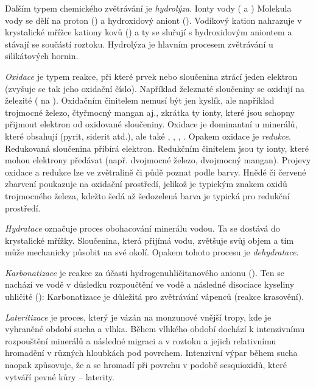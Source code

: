 Dalším typem chemického zvětrávání je \emph{hydrolýza}. Ionty vody ( a )  Molekula vody se dělí na proton () a hydroxidový aniont (). Vodíkový kation nahrazuje v krystalické mřížce kationy kovů () a ty se sluřují s hydroxidovým aniontem a stávají se součástí roztoku. Hydrolýza je hlavním procesem zvětrávání u silikátových hornin.

\emph{Oxidace} je typem reakce, při které prvek nebo sloučenina ztrácí jeden elektron (zvyšuje se tak jeho oxidační číslo). Například železnaté sloučeniny se oxidují na železité ( na ). Oxidačním činitelem nemusí být jen kyslík, ale například trojmocné železo, čtyřmocný mangan aj., zkrátka ty ionty, které jsou schopny přijmout elektron od oxidované sloučeniny. Oxidace je dominantní u minerálů, které obsahují  (pyrit, siderit atd.), ale také , , , . Opakem oxidace je \emph{redukce}. Redukovaná sloučenina přibírá elektron. Redukčním činitelem jsou ty ionty, které mohou elektrony předávat (např. dvojmocné železo, dvojmocný mangan). Projevy oxidace a redukce lze ve zvětralině či půdě poznat podle barvy. Hnědé či červené zbarvení poukazuje na oxidační prostředí, jelikož je typickým znakem oxidů trojmocného železa, kdežto šedá až šedozelená barva je typická pro redukční prostředí.


\emph{Hydratace} označuje proces obohacování minerálu vodou. Ta se dostává do krystalické mřížky. Sloučenina, která přijímá vodu, zvětšuje svůj objem a tím může mechanicky působit na své okolí. Opakem tohoto procesu je \emph{dehydratace}.

\emph{Karbonatizace} je reakce za účasti hydrogenuhličitanového anionu (). Ten se nachází ve vodě v důsledku rozpoučtění  ve vodě a následné disociace kyseliny uhličité (): 
Karbonatizace je důležitá pro zvětrávání vápenců (reakce krasovění).

\emph{Lateritizace} je proces, který je vázán na monzunové vnější tropy, kde je vyhraněné období sucha a vlhka. Během vlhkého období dochází k intenzivnímu rozpouštění minerálů a následné migraci  a  v roztoku a jejich relativnímu hromadění v různých hloubkách pod povrchem. Intenzivní výpar během sucha naopak způsovuje, že  a  se hromadí při povrchu v podobě sesquioxidů, které vytváří pevné kůry -- laterity.

